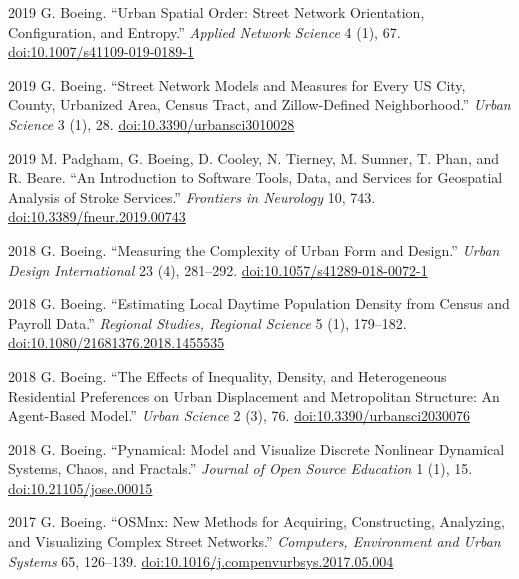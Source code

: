 \documentclass[11pt,letterpaper]{report}
\begin{document}
\begin{tablist}
        \item[2019] \tab{}G. Boeing. \enquote{Urban Spatial Order: Street Network Orientation, Configuration, and Entropy.} \textit{Applied Network Science} 4 (1), 67. \href{https://doi.org/10.1007/s41109-019-0189-1}{doi:10.1007/s41109-019-0189-1}

        \item[2019] \tab{}G. Boeing. \enquote{Street Network Models and Measures for Every US City, County, Urbanized Area, Census Tract, and Zillow-Defined Neighborhood.} \textit{Urban Science} 3 (1), 28. \href{https://doi.org/10.3390/urbansci3010028}{doi:10.3390/urbansci3010028}

        \item[2019] \tab{}M. Padgham, G. Boeing, D. Cooley, N. Tierney, M. Sumner, T. Phan, and R. Beare. \enquote{An Introduction to Software Tools, Data, and Services for Geospatial Analysis of Stroke Services.} \textit{Frontiers in Neurology} 10, 743. \href{https://doi.org/10.3389/fneur.2019.00743}{doi:10.3389/fneur.2019.00743}

        \item[2018] \tab{}G. Boeing. \enquote{Measuring the Complexity of Urban Form and Design.} \textit{Urban Design International} 23 (4), 281--292. \href{https://doi.org/10.1057/s41289-018-0072-1}{doi:10.1057/s41289-018-0072-1}

        \item[2018] \tab{}G. Boeing. \enquote{Estimating Local Daytime Population Density from Census and Payroll Data.} \textit{Regional Studies, Regional Science} 5 (1), 179--182. \href{https://doi.org/10.1080/21681376.2018.1455535}{doi:10.1080/21681376.2018.1455535}

        \item[2018] \tab{}G. Boeing. \enquote{The Effects of Inequality, Density, and Heterogeneous Residential Preferences on Urban Displacement and Metropolitan Structure: An Agent-Based Model.} \textit{Urban Science} 2 (3), 76. \href{https://doi.org/10.3390/urbansci2030076}{doi:10.3390/urbansci2030076}

        \item[2018] \tab{}G. Boeing. \enquote{Pynamical: Model and Visualize Discrete Nonlinear Dynamical Systems, Chaos, and Fractals.} \textit{Journal of Open Source Education} 1 (1), 15. \href{https://doi.org/10.21105/jose.00015}{doi:10.21105/jose.00015}

        \item[2017] \tab{}G. Boeing. \enquote{OSMnx: New Methods for Acquiring, Constructing, Analyzing, and Visualizing Complex Street Networks.} \textit{Computers, Environment and Urban Systems} 65, 126--139. \href{https://doi.org/10.1016/j.compenvurbsys.2017.05.004}{doi:10.1016/j.compenvurbsys.2017.05.004}


\end{tablist}
\end{document}
